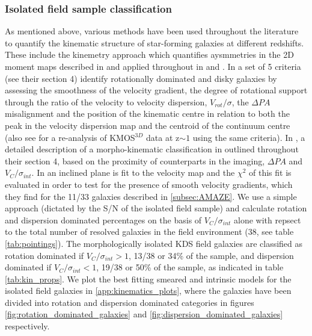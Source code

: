 \documentclass[fleqn,usenatbib]{mn2e}
\begin{document}
\subsubsection{Isolated field sample classification}\label{subsubsection:isolated_classification}
As mentioned above, various methods have been used throughout the literature to quantify the kinematic structure of star-forming galaxies at different redshifts. 
These include the kinemetry approach which quantifies aysmmetries in the 2D moment maps described in \cite{Shapiro2008} and applied throughout in \cite{ForsterSchreiber2009} and \cite{Cresci2009}.
In \cite{Wisnioski2015} a set of 5 criteria (see their section 4) identify rotationally dominated and disky galaxies by assessing the smoothness of the velocity gradient, the degree of rotational support through the ratio of the velocity to velocity dispersion, $V_{rot}/\sigma$, the $\Delta PA$ misalignment and the position of the kinematic centre in relation to both the peak in the velocity dispersion map and the centroid of the continuum centre (also see \cite{Rodrigues2016} for a re-analysis of KMOS$^{3D}$ data at z$\sim 1$ using the same criteria).   
In \cite{Epinat2012}, a detailed description of a morpho-kinematic classification in outlined throughout their section 4, based on the proximity of counterparts in the imaging, $\Delta PA$ and $V_{C}/\sigma_{int}$.
In \cite{Gnerucci2011} an inclined plane is fit to the velocity map and the $\chi^{2}$ of this fit is evaluated in order to test for the presence of smooth velocity gradients, which they find for the 11/33 galaxies described in \cref{subsec:AMAZE}.
We use a simple approach (dictated by the S/N of the isolated field sample) and calculate rotation and dispersion dominated percentages on the basis of $V_{C}/\sigma_{int}$ alone with repsect to the total number of resolved galaxies in the field environment (38, see table \ref{tab:pointings}).
The morphologically isolated KDS field galaxies are classified as rotation dominated if $V_{C}/\sigma_{int} > 1$, 13/38 or 34\% of the sample, and dispersion dominated if $V_{C}/\sigma_{int} < 1$, 19/38 or 50\% of the sample, as indicated in table \ref{tab:kin_props}.
We plot the best fitting smeared and intrinsic models for the isolated field galaxies in \cref{app:kinematics_plots}, where the galaxies have been divided into rotation and dispersion dominated categories in figures \ref{fig:rotation_dominated_galaxies} and \ref{fig:dispersion_dominated_galaxies} respectively.
\end{document}
